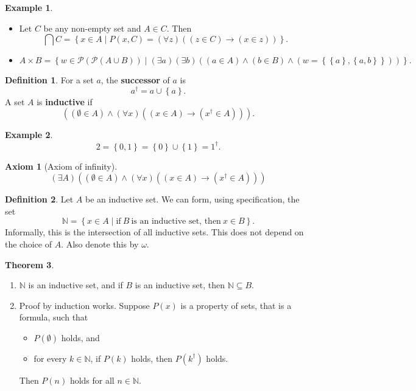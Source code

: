 \documentclass{article}
\newcommand{\N}{\mathbb{N}}
\newcommand{\rb}[1]{\left( #1 \right)}
\newcommand{\cb}[1]{\left\{ #1 \right\}}
\newcommand{\andb}[2]{\rb{#1 \land #2}}
\newcommand{\impb}[2]{\rb{#1 \rightarrow #2}}
\newcommand{\fab}[1]{\rb{\forall #1}}
\newcommand{\teb}[1]{\rb{\exists #1}}
\newcommand{\eqb}[2]{\rb{#1 = #2}}
\newcommand{\inb}[2]{\rb{#1 \in #2}}
\theoremstyle{definition}\newtheorem{definition}{Definition}[subsection]
\theoremstyle{definition}\newtheorem{remark1}[definition]{Remark}
\theoremstyle{definition}\newtheorem{example1}[definition]{Example}
\theoremstyle{definition}\newtheorem*{remark2}{Remark}
\theoremstyle{definition}\newtheorem*{example2}{Example}
\theoremstyle{definition}\newtheorem*{note}{Note}
\theoremstyle{definition}\newtheorem*{notation}{Notation}
\newtheorem{theorem}[definition]{Theorem}
\newtheorem{axiom}{Axiom}
\begin{document}
\begin{example2}
\hfill
\begin{itemize}
\item Let $ C $ be any non-empty set and $ A \in C $. Then
$$ \bigcap C = \cb{x \in A \mid P\rb{x, C} = \fab{z}\impb{\inb{z}{C}}{\inb{x}{z}}}. $$
\item
$$ A \times B = \cb{w \in \mathcal{P}\rb{\mathcal{P}\rb{A \cup B}} \mid \teb{a}\teb{b}\rb{\inb{a}{A} \land \inb{b}{B} \land \eqb{w}{\cb{\cb{a}, \cb{a, b}}}}}. $$
\end{itemize}
\end{example2}

\begin{definition}
For a set $ a $, the \textbf{successor} of $ a $ is
$$ a^\dagger = a \cup \cb{a}. $$
A set $ A $ is \textbf{inductive} if
$$ \andb{\inb{\emptyset}{A}}{\fab{x}\impb{\inb{x}{A}}{\inb{x^\dagger}{A}}}. $$
\end{definition}

\begin{example2}
$$ 2 = \cb{0, 1} = \cb{0} \cup \cb{1} = 1^\dagger. $$
\end{example2}

\begin{axiom}[Axiom of infinity]
$$ \teb{A}\andb{\inb{\emptyset}{A}}{\fab{x}\impb{\inb{x}{A}}{\inb{x^\dagger}{A}}} $$
\end{axiom}

\begin{definition}
Let $ A $ be an inductive set. We can form, using specification, the set
$$ \N = \cb{x \in A \mid \text{if} \ B \ \text{is an inductive set, then} \ x \in B}. $$
Informally, this is the intersection of all inductive sets. This does not depend on the choice of $ A $. Also denote this by $ \omega $.
\end{definition}

\begin{theorem}
\label{thm:3.2.3}
\hfill
\begin{enumerate}
\item $ \N $ is an inductive set, and if $ B $ is an inductive set, then $ \N \subseteq B $.
\item Proof by induction works. Suppose $ P\rb{x} $ is a property of sets, that is a formula, such that
\begin{itemize}
\item $ P\rb{\emptyset} $ holds, and
\item for every $ k \in \N $, if $ P\rb{k} $ holds, then $ P\rb{k^\dagger} $ holds.
\end{itemize}
Then $ P\rb{n} $ holds for all $ n \in \N $.
\end{enumerate}
\end{theorem}
\end{document}
